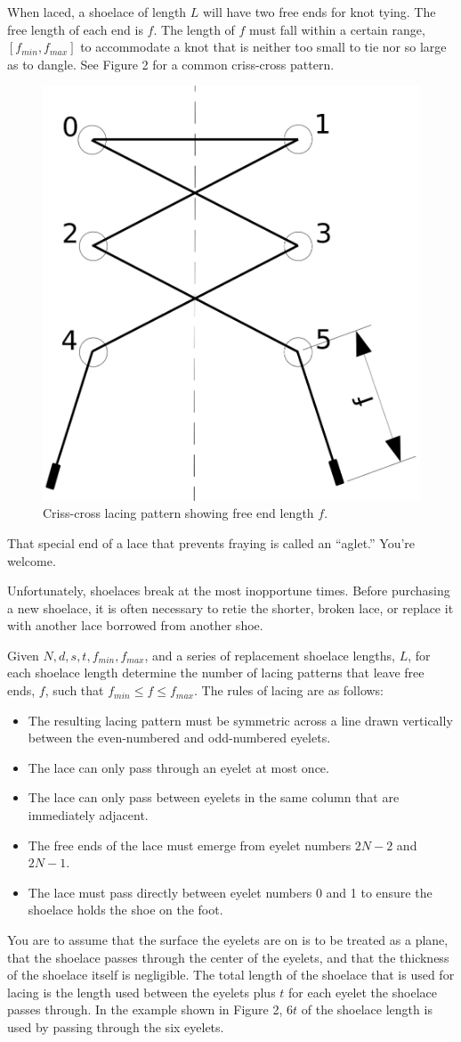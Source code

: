 When laced, a shoelace of length $L$ will have two free ends for knot tying.
The free length of each end is $f$.  The length of $f$ must fall within a
certain range, $[f_{min}, f_{max}]$ to accommodate a knot that is neither too
small to tie nor so large as to dangle.  See Figure 2 for a common
criss-cross pattern.
\begin{figure}[h]
	\begin{center}
		\includegraphics[width=.32\textwidth]{LacingPattern.png}
	\end{center}
	\caption{Criss-cross lacing pattern showing free end length $f$.}
\end{figure}
\par
That special end of a lace that prevents fraying is called an ``aglet.''
You're welcome.
\par
Unfortunately, shoelaces break at the most inopportune times.  Before
purchasing a new shoelace, it is often necessary to retie the shorter, broken
lace, or replace it with another lace borrowed from another shoe.
\par
Given $N, d, s, t, f_{min}, f_{max}$, and a series of replacement shoelace
lengths, $L$, for each shoelace length determine the number of lacing
patterns that leave free ends,
$f$, such that $f_{min} \le f \le f_{max}$.  The rules of lacing are as
follows:
\begin{itemize}
	\item The resulting lacing pattern must be symmetric across a
	line drawn vertically between the even-numbered and odd-numbered eyelets.
	\item The lace can only pass through an eyelet at most once.
	\item The lace can only pass between eyelets in the same
	column that are immediately adjacent.
	\item The free ends of the lace must emerge from eyelet numbers
	$2N - 2$ and $2N - 1$.
	\item The lace must pass directly between eyelet numbers
	0 and 1 to ensure the shoelace holds the shoe on the foot.
\end{itemize}
\par
You are to assume that the surface the eyelets are on is to be treated as
a plane, that the shoelace passes through the center of the eyelets,
and that the thickness of the shoelace itself is negligible.
The total length of the shoelace that is used for lacing is the length
used between the eyelets plus $t$ for each eyelet the shoelace passes
through.  In the example shown in Figure 2, $6t$ of the shoelace length
is used by passing through the six eyelets.

